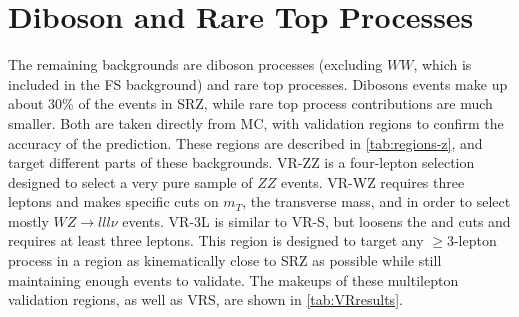 \section{Diboson and Rare Top Processes}
\label{sec:bg-other}

The remaining backgrounds are diboson processes (excluding $WW$, which is included in the \ac{FS} background) and rare top processes. Dibosons events make up about 30\% of the events in SRZ, while rare top process contributions are much smaller. Both are taken directly from \ac{MC}, with validation regions to confirm the accuracy of the prediction. These regions are described in \autoref{tab:regions-z}, and target different parts of these backgrounds. VR-ZZ is a four-lepton selection designed to select a very pure sample of $ZZ$ events. VR-WZ requires three leptons and makes specific cuts on $m_T$, the transverse mass, and \met in order to select mostly $WZ\rightarrow lll\nu$ events. VR-3L is similar to VR-S, but loosens the \HT and \met cuts and requires at least three leptons. This region is designed to target any $\geq3$-lepton process in a region as kinematically close to SRZ as possible while still maintaining enough events to validate. The makeups of these multilepton validation regions, as well as VRS, are shown in \autoref{tab:VRresults}.



